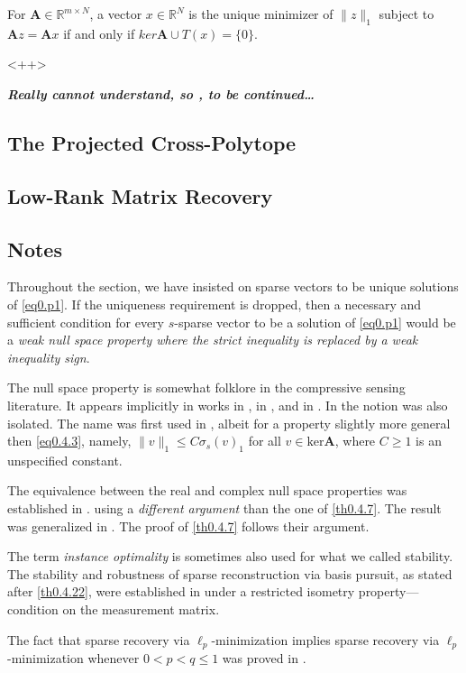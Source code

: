 \begin{theorem}
    \label{th0.4.35}
    For $\mathbf{A} \in \mathbb{R}^{m \times N}$, a vector $x \in \mathbb{R}^N$ is the unique minimizer of $\|z\|_1$ subject to $\mathbf{A}z = \mathbf{A}x$ if and only if $ker\mathbf{A} \cup T(x) = \{0\}$.
\end{theorem}<++>

\emph{\textbf{\textcolor[rgb]{1,0,0}{Really cannot understand, so , to be continued\dots}}}

\subsection{The Projected Cross-Polytope}

\subsection{Low-Rank Matrix Recovery}

\subsection{Notes}

Throughout the section, we have insisted on sparse vectors to be unique solutions of \cref{eq0.p1}. If the uniqueness requirement is dropped, then a necessary and sufficient condition for every $s$-sparse vector to be a solution of \cref{eq0.p1} would be a \textcolor[rgb]{1,0,0}{\emph{weak null space property where the strict inequality is replaced by a weak inequality sign}}.

The null space property is somewhat folklore in the compressive sensing literature. It appears implicitly in works in \cite{Donoho2003}, in \cite{Donoho2001}, and in \cite{Elad2002}. In \cite{Gribonval2003} the notion was also isolated. The name was first used in \cite{Cohen2009}, albeit for a property slightly more general then \cref{eq0.4.3}, namely, $\|v\|_1 \leq C\sigma_s(v)_1$ for all $v \in \text{ker}\mathbf{A}$, where $C \geq 1$ is an unspecified constant. 

The equivalence between the real and complex null space properties was established in \cite{Foucart2010}. using a \emph{\textcolor[rgb]{1,0,0}{different argument}} than the one of \cref{th0.4.7}. The result was generalized in \cite{Lai2011}. The proof of \cref{th0.4.7} follows their argument.

The term \emph{\textcolor[rgb]{1,0,0}{instance optimality}} is sometimes also used for what we called stability. The stability and robustness of sparse reconstruction via basis pursuit, as stated after \cref{th0.4.22}, were established in \cite{Candes2006a} under a restricted isometry property---condition on the measurement matrix.

The fact that sparse recovery via $\ell_p$-minimization implies sparse recovery via $\ell_p$-minimization whenever $0<p<q\leq 1$ was proved in \cite{Gribonval2007}. 









